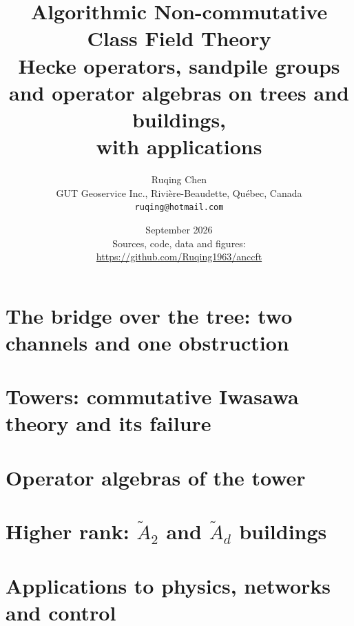 \documentclass[11pt,twoside,openright]{book}
\title{\bfseries Algorithmic Non-commutative Class Field Theory\\[6pt]
\large Hecke operators, sandpile groups and operator algebras on trees and buildings,\\ with applications}
\author{Ruqing Chen\\[4pt]\normalsize GUT Geoservice Inc., Rivi\`ere-Beaudette, Qu\'ebec, Canada\\
\normalsize\texttt{ruqing@hotmail.com}}
\date{September 2026\\[10pt]\normalsize Sources, code, data and figures:\\
\url{https://github.com/Ruqing1963/anccft}}
\numberwithin{equation}{section}
\theoremstyle{plain}
\theoremstyle{definition}
\theoremstyle{remark}
\begin{document}
\frontmatter
\maketitle

\tableofcontents

\mainmatter

\part{The bridge over the tree: two channels and one obstruction}




\part{Towers: commutative Iwasawa theory and its failure}







\part{Operator algebras of the tower}



\part{\texorpdfstring{Higher rank: $\widetilde A_2$ and $\widetilde A_d$ buildings}{Higher rank: A2 and Ad buildings}}






\part{Applications to physics, networks and control}





\backmatter

\end{document}
